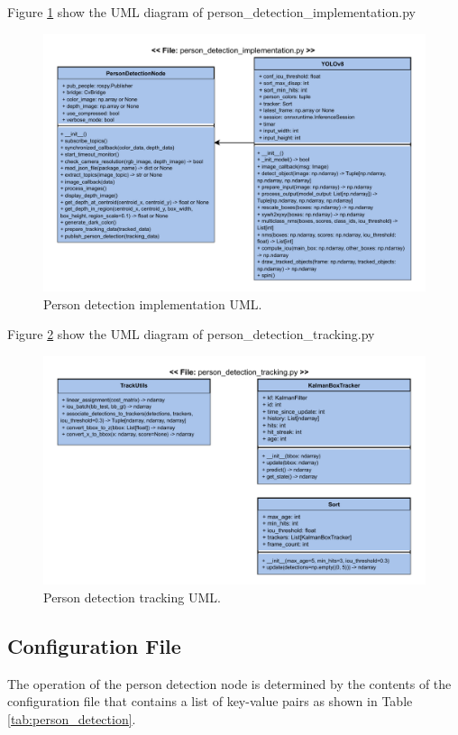 \documentclass{CSSRforAfrica}
\begin{document}
Figure \ref{fig:Person_implementation_UML} show the UML diagram of person\_detection\_implementation.py
\begin{figure}[!hbpt]
	\centering
	\includegraphics[scale=0.75]{images/Person_implementation_UML.pdf}
	\caption{Person detection implementation UML.}
	\label{fig:Person_implementation_UML}
\end{figure}

Figure \ref{fig:Person_detection_tracking_UML} show the UML diagram of person\_detection\_tracking.py
\begin{figure}[!hbpt]
	\centering
	\includegraphics[scale=0.75]{images/Person_Tracking_UML.pdf}
	\caption{Person detection tracking UML.}
	\label{fig:Person_detection_tracking_UML}
\end{figure}

\newpage

\subsection*{Configuration File}
The operation of the person detection node is determined by the contents of the configuration file that contains a list of key-value pairs as shown in Table \ref{tab:person_detection}. 
\end{document}
